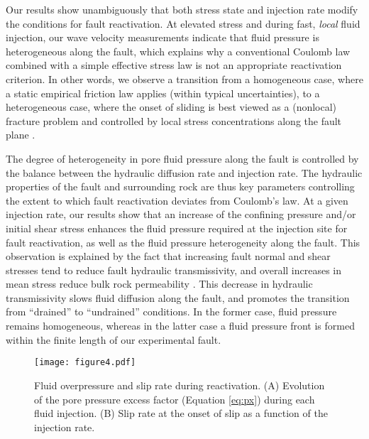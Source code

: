 \documentclass[grl]{agutex2arxiv}
\begin{document}
\begin{article}
Our results show unambiguously that both stress state and injection rate modify the conditions for fault reactivation. At elevated stress and during fast, \emph{local} fluid injection, our wave velocity measurements indicate that fluid pressure is heterogeneous along the fault, which explains why a conventional Coulomb law combined with a simple effective stress law is not an appropriate reactivation criterion. In other words, we observe a transition from a homogeneous case, where a static empirical friction law applies (within typical uncertainties), to a heterogeneous case, where the onset of sliding is best viewed as a (nonlocal) fracture problem and controlled by local stress concentrations along the fault plane \citep[e.g.,][]{Rubinstein2004,Svetlizky2014}.

The degree of heterogeneity in pore fluid pressure along the fault is controlled by the balance between the hydraulic diffusion rate and injection rate. The hydraulic properties of the fault and surrounding rock are thus key parameters controlling the extent to which fault reactivation deviates from Coulomb's law. At a given injection rate, our results show that an increase of the confining pressure and/or initial shear stress enhances the fluid pressure required at the injection site for fault reactivation, as well as the fluid pressure heterogeneity along the fault. This observation is explained by the fact that increasing fault normal and shear stresses tend to reduce fault hydraulic transmissivity\citep[e.g.,][]{Rutter2017}, and overall increases in mean stress reduce bulk rock permeability \citep[e.g.,][]{Nasseri2009}. This decrease in hydraulic transmissivity slows fluid diffusion along the fault, and promotes the transition from ``drained'' to ``undrained'' conditions. In the former case, fluid pressure remains homogeneous, whereas in the latter case a fluid pressure front is formed within the finite length of our experimental fault.%


\begin{figure*}
\begin{center}
\texttt{[image: figure4.pdf]}
\end{center}
\caption{Fluid overpressure and slip rate during reactivation. (A) Evolution of the pore pressure excess factor (Equation \protect\ref{eq:px}) during each fluid injection. (B) Slip rate at the onset of slip as a function of the injection rate.}
\label{fig:overpressure}
\end{figure*}



\end{article}
\end{document}
